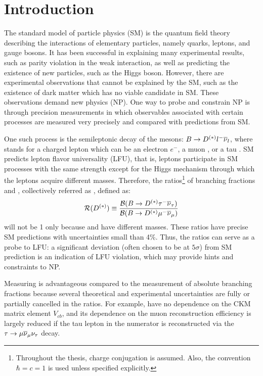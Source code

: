 \chapter{Introduction}
\label{ref:intro}

The standard model of particle physics (SM)
is the quantum field theory describing the interactions of elementary particles,
namely quarks, leptons, and gauge bosons.
It has been successful in explaining many experimental results, such as parity
violation in the weak interaction,
as well as predicting the existence of new particles, such as the Higgs boson.
However,
there are experimental observations that cannot be explained by the SM,
such as the existence of dark matter
which has no viable candidate in SM.
These observations demand new physics (NP).
One way to probe and constrain NP is through precision measurements
in which observables associated with certain processes are measured very
precisely and compared with predictions from SM.

One such process is the semileptonic decay of the \B mesons:
$B \rightarrow D^{(*)} {l^-} {{\overline{\nu}}_l}$,
where \ellm stands for a charged lepton which can be an electron $e^-$,
a muon \mun, or a tau \taum.
SM predicts lepton flavor universality (LFU),
that is, leptons participate in SM processes with the same strength
except for the Higgs mechanism through which the leptons acquire different
masses.
Therefore,
the ratios\footnote{
    Throughout the thesis, charge conjugation is assumed.
    Also, the convention $\hbar = c = 1$ is used unless specified explicitly.
} of branching fractions \RD and \RDst,
collectively referred as \RDX, defined as:
\begin{equation}
    \mathcal{R}(D^{(*)}) \equiv \frac{\mathcal{B}(B \rightarrow D^{(*)} {\tau^-} {{\overline{\nu}}_\tau})}{\mathcal{B}(B \rightarrow D^{(*)} {\mu^-} {{\overline{\nu}}_\mu})}
\end{equation}
will not be 1 only because \taum and \mun have different masses.
These ratios have precise SM predictions with uncertainties small than 4\%.
Thus, the ratios can serve as a probe to LFU:
a significant deviation (often chosen to be at $5\sigma$) from SM prediction is
an indication of LFU violation,
which may provide hints and constraints to NP.

Measuring \RDX is advantageous compared to the measurement of absolute branching
fractions because several theoretical and experimental uncertainties are fully
or partially cancelled in the ratios.
For example,
\RDX have no dependence on the CKM matrix element $V_{cb}$,
and its dependence on the muon reconstruction efficiency is largely reduced
if the tau lepton in the numerator is reconstructed via the
$\tau \rightarrow \mu {\ensuremath{{\overline{\nu}}_\mu}} {\ensuremath{{\nu}_\tau}}$ decay.

